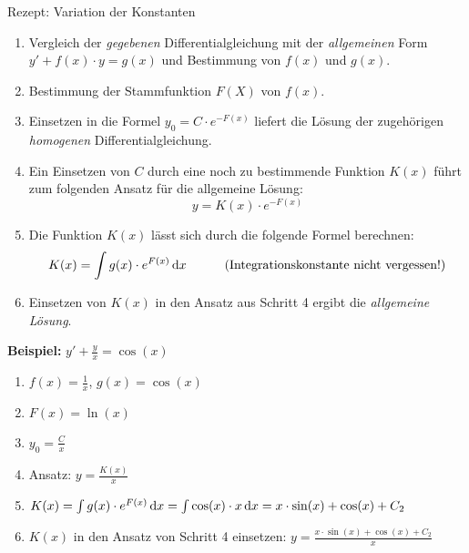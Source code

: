 \begin{subbox}{Rezept: Variation der Konstanten}
    \begin{enumerate}
        \item Vergleich der \emph{gegebenen} Differentialgleichung mit der \emph{allgemeinen} Form $y' + f(x) \cdot y = g(x)$ und Bestimmung von $f(x)$ und $g(x)$.
        \item Bestimmung der Stammfunktion $F(X)$ von $f(x)$.
        \item Einsetzen in die Formel $y_0 = C \cdot e^{-F(x)}$ liefert die Lösung der zugehörigen \emph{homogenen} Differentialgleichung.
        \item Ein Einsetzen von $C$ durch eine noch zu bestimmende Funktion $K(x)$ führt zum folgenden Ansatz für die allgemeine Lösung: \[y = K(x) \cdot e^{-F(x)}\]
        \item Die Funktion $K(x)$ lässt sich durch die folgende Formel berechnen: \[K(x) = \int g(x) \cdot e^{F(x)} \,\mathrm{d}x \quad\quad\quad \text{(Integrationskonstante nicht vergessen!)}\]
        \item Einsetzen von $K(x)$ in den Ansatz aus Schritt 4 ergibt die \emph{allgemeine Lösung}.
    \end{enumerate}
\end{subbox}

\textbf{Beispiel:} $y' + \frac{y}{x} = \cos(x)$
\begin{enumerate}
    \item $f(x) = \frac{1}{x}$, $g(x) = \cos(x)$
    \item $F(x) = \ln(x)$
    \item $y_0 = \frac{C}{x}$
    \item Ansatz: $y = \frac{K(x)}{x}$
    \item $K(x) = \int g(x) \cdot e^{F(x)} \,\mathrm{d}x = \int \cos(x) \cdot x \,\mathrm{d}x = x \cdot \sin(x) + \cos(x) + C_2$
    \item $K(x)$ in den Ansatz von Schritt 4 einsetzen: $y = \frac{x \cdot \sin(x) + \cos(x) + C_2}{x}$
\end{enumerate}